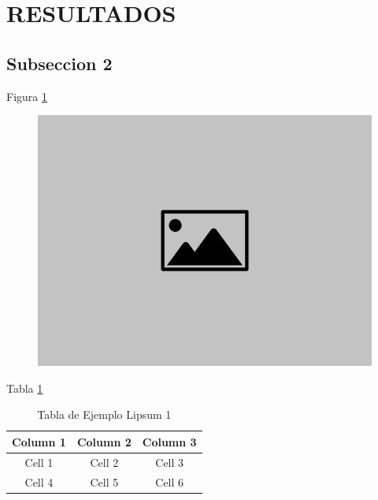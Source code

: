 \pagestyle{fancy}
\section{RESULTADOS}

    \subsection{
        Subseccion 2
        \label{analisys_ini}
    }
    
    \begin{justify}
        \lipsum[2][1-5] Figura \ref{fig:img_example3} \lipsum[2][6-15] \\
    \end{justify}
    
    \begin{figure}[!ht]
        \centering
        \includegraphics[scale=0.2]{img/default-image.jpg}
        \caption{\lipsum[3][1]}
        \label{fig:img_example3}
    \end{figure}

    \begin{justify}
        \lipsum[1][1-5] Tabla \ref{tab:example_table} \lipsum[1][6-15] \\
    \end{justify}
    
    \begin{table}[htbp]
        \centering
            \begin{tabular}{|c|c|c|}
            \hline
            \textbf{Column 1} & \textbf{Column 2} & \textbf{Column 3} \\
            \hline
            Cell 1 & Cell 2 & Cell 3 \\
            \hline
            Cell 4 & Cell 5 & Cell 6 \\
            \hline
        \end{tabular}
        \caption{Tabla de Ejemplo Lipsum 1}
        \label{tab:example_table}
    \end{table}
    
